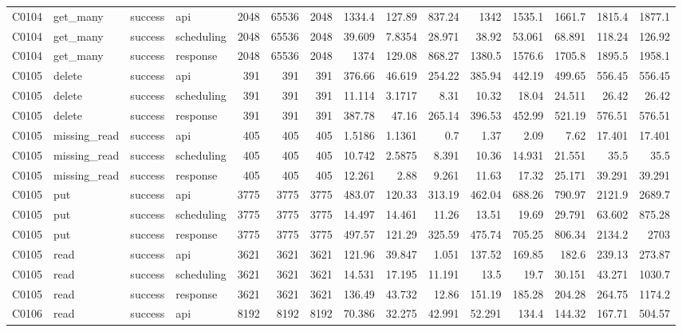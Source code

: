 \begin{landscape}
\begin{longtable}{llllrrrrrrrrrrr}
C0104 & get\_\allowbreak{}many & success & api & 2048 & 65536 & 2048 & 1334.4 & 127.89 & 837.24 & 1342 & 1535.1 & 1661.7 & 1815.4 & 1877.1\\
C0104 & get\_\allowbreak{}many & success & scheduling & 2048 & 65536 & 2048 & 39.609 & 7.8354 & 28.971 & 38.92 & 53.061 & 68.891 & 118.24 & 126.92\\
C0104 & get\_\allowbreak{}many & success & response & 2048 & 65536 & 2048 & 1374 & 129.08 & 868.27 & 1380.5 & 1576.6 & 1705.8 & 1895.5 & 1958.1\\
C0105 & delete & success & api & 391 & 391 & 391 & 376.66 & 46.619 & 254.22 & 385.94 & 442.19 & 499.65 & 556.45 & 556.45\\
C0105 & delete & success & scheduling & 391 & 391 & 391 & 11.114 & 3.1717 & 8.31 & 10.32 & 18.04 & 24.511 & 26.42 & 26.42\\
C0105 & delete & success & response & 391 & 391 & 391 & 387.78 & 47.16 & 265.14 & 396.53 & 452.99 & 521.19 & 576.51 & 576.51\\
C0105 & missing\_\allowbreak{}read & success & api & 405 & 405 & 405 & 1.5186 & 1.1361 & 0.7 & 1.37 & 2.09 & 7.62 & 17.401 & 17.401\\
C0105 & missing\_\allowbreak{}read & success & scheduling & 405 & 405 & 405 & 10.742 & 2.5875 & 8.391 & 10.36 & 14.931 & 21.551 & 35.5 & 35.5\\
C0105 & missing\_\allowbreak{}read & success & response & 405 & 405 & 405 & 12.261 & 2.88 & 9.261 & 11.63 & 17.32 & 25.171 & 39.291 & 39.291\\
C0105 & put & success & api & 3775 & 3775 & 3775 & 483.07 & 120.33 & 313.19 & 462.04 & 688.26 & 790.97 & 2121.9 & 2689.7\\
C0105 & put & success & scheduling & 3775 & 3775 & 3775 & 14.497 & 14.461 & 11.26 & 13.51 & 19.69 & 29.791 & 63.602 & 875.28\\
C0105 & put & success & response & 3775 & 3775 & 3775 & 497.57 & 121.29 & 325.59 & 475.74 & 705.25 & 806.34 & 2134.2 & 2703\\
C0105 & read & success & api & 3621 & 3621 & 3621 & 121.96 & 39.847 & 1.051 & 137.52 & 169.85 & 182.6 & 239.13 & 273.87\\
C0105 & read & success & scheduling & 3621 & 3621 & 3621 & 14.531 & 17.195 & 11.191 & 13.5 & 19.7 & 30.151 & 43.271 & 1030.7\\
C0105 & read & success & response & 3621 & 3621 & 3621 & 136.49 & 43.732 & 12.86 & 151.19 & 185.28 & 204.28 & 264.75 & 1174.2\\
C0106 & read & success & api & 8192 & 8192 & 8192 & 70.386 & 32.275 & 42.991 & 52.291 & 134.4 & 144.32 & 167.71 & 504.57\\

\end{longtable}
\end{landscape}
